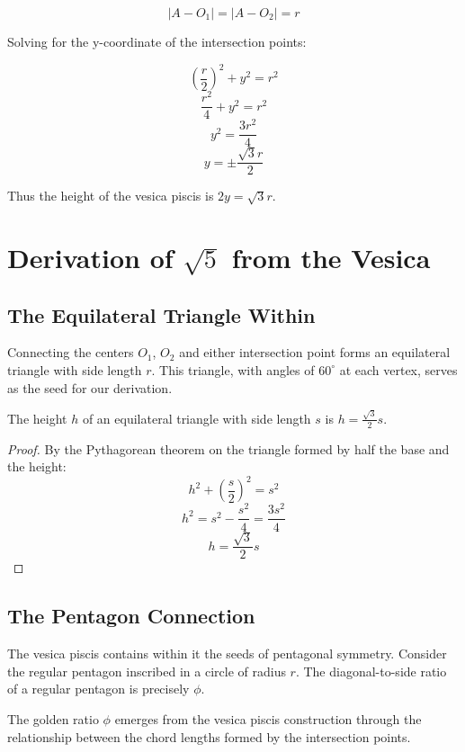 \[
|A - O_1| = |A - O_2| = r
\]

Solving for the y-coordinate of the intersection points:

\[
\left(\frac{r}{2}\right)^2 + y^2 = r^2
\]
\[
\frac{r^2}{4} + y^2 = r^2
\]
\[
y^2 = \frac{3r^2}{4}
\]
\[
y = \pm\frac{\sqrt{3}r}{2}
\]

Thus the height of the vesica piscis is $2y = \sqrt{3}r$.

\section{Derivation of $\sqrt{5}$ from the Vesica}

\subsection{The Equilateral Triangle Within}

Connecting the centers $O_1$, $O_2$ and either intersection point forms an equilateral triangle with side length $r$. This triangle, with angles of $60^\circ$ at each vertex, serves as the seed for our derivation.

\begin{lemma}
The height $h$ of an equilateral triangle with side length $s$ is $h = \frac{\sqrt{3}}{2}s$.
\end{lemma}

\begin{proof}
By the Pythagorean theorem on the triangle formed by half the base and the height:
\[
h^2 + \left(\frac{s}{2}\right)^2 = s^2
\]
\[
h^2 = s^2 - \frac{s^2}{4} = \frac{3s^2}{4}
\]
\[
h = \frac{\sqrt{3}}{2}s
\]
\end{proof}

\subsection{The Pentagon Connection}

The vesica piscis contains within it the seeds of pentagonal symmetry. Consider the regular pentagon inscribed in a circle of radius $r$. The diagonal-to-side ratio of a regular pentagon is precisely $\phi$.

\begin{theorem}
The golden ratio $\phi$ emerges from the vesica piscis construction through the relationship between the chord lengths formed by the intersection points.
\end{theorem}

